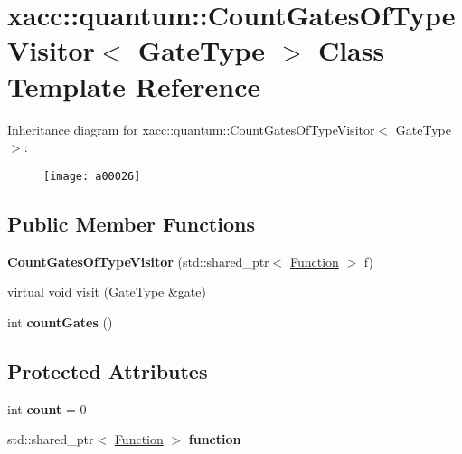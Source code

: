 \hypertarget{a00026}{}\section{xacc\+:\+:quantum\+:\+:Count\+Gates\+Of\+Type\+Visitor$<$ Gate\+Type $>$ Class Template Reference}
\label{a00026}
Inheritance diagram for xacc\+:\+:quantum\+:\+:Count\+Gates\+Of\+Type\+Visitor$<$ Gate\+Type $>$\+:\begin{figure}[H]
\begin{center}
\leavevmode
\texttt{[image: a00026]}
\end{center}
\end{figure}
\subsection*{Public Member Functions}
\begin{DoxyCompactItemize}
\item 
{\bfseries Count\+Gates\+Of\+Type\+Visitor} (std\+::shared\+\_\+ptr$<$ \hyperlink{a00039}{Function} $>$ f)\hypertarget{a00026_a4c2507e3ee4fe51e7ff4501bf5569cfc}{}\label{a00026_a4c2507e3ee4fe51e7ff4501bf5569cfc}

\item 
virtual void \hyperlink{a00026_a9c40e6cb4b74e2d6714c531ffc3b2909}{visit} (Gate\+Type \&gate)
\item 
int {\bfseries count\+Gates} ()\hypertarget{a00026_a8a1a17ed50cd6727c2eb07976f886389}{}\label{a00026_a8a1a17ed50cd6727c2eb07976f886389}

\end{DoxyCompactItemize}
\subsection*{Protected Attributes}
\begin{DoxyCompactItemize}
\item 
int {\bfseries count} = 0\hypertarget{a00026_ae3d8ae4c40c1552ee68aa6e5002e42bd}{}\label{a00026_ae3d8ae4c40c1552ee68aa6e5002e42bd}

\item 
std\+::shared\+\_\+ptr$<$ \hyperlink{a00039}{Function} $>$ {\bfseries function}\hypertarget{a00026_a202ab6e0e365af735da706fe972333e7}{}\label{a00026_a202ab6e0e365af735da706fe972333e7}

\end{DoxyCompactItemize}


